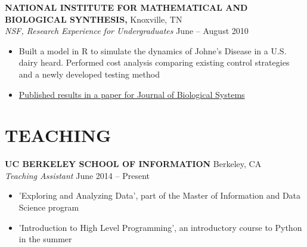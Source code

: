 \documentclass[margin]{res}
\begin{document}
\begin{resume}
{\bf NATIONAL INSTITUTE FOR MATHEMATICAL AND BIOLOGICAL SYNTHESIS,} Knoxville, TN \\
{\em NSF, Research Experience for Undergraduates}    \hfill
June -- August 2010 \\                                          \vspace{-4mm}
\begin{itemize}                                         \itemsep1pt 
        \item Built a model in R to simulate the dynamics of Johne's Disease in a U.S. dairy heard. Performed cost analysis comparing existing control strategies and a newly developed testing method
        \item \href{http://www.worldscientific.com/doi/abs/10.1142/S021833901340010X}{Published results in a paper for Journal of Biological Systems}
\end{itemize}
\vspace{-2mm}


\section{TEACHING}
{\bf UC BERKELEY SCHOOL OF INFORMATION} Berkeley, CA \\
{\em Teaching Assistant} \hfill
June 2014 -- Present \\                                          \vspace{-4mm}
\begin{itemize}                                         \itemsep1pt %
        \item   'Exploring and Analyzing Data', part of the Master of Information and Data Science program
        \item   'Introduction to High Level Programming', an introductory course to Python in the summer
\end{itemize}
\vspace{-2mm}


\end{resume}
\end{document}
